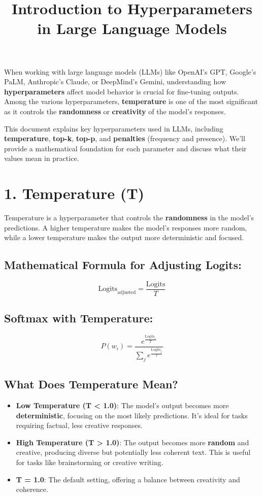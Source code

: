 \documentclass{article}
\title{Introduction to Hyperparameters in Large Language Models}
\author{}
\date{}
\begin{document}
\maketitle

When working with large language models (LLMs) like OpenAI's GPT, Google’s PaLM, Anthropic’s Claude, or DeepMind's Gemini, understanding how \textbf{hyperparameters} affect model behavior is crucial for fine-tuning outputs. Among the various hyperparameters, \textbf{temperature} is one of the most significant as it controls the \textbf{randomness} or \textbf{creativity} of the model's responses.

This document explains key hyperparameters used in LLMs, including \textbf{temperature}, \textbf{top-k}, \textbf{top-p}, and \textbf{penalties} (frequency and presence). We'll provide a mathematical foundation for each parameter and discuss what their values mean in practice.

\section{1. Temperature (T)}

Temperature is a hyperparameter that controls the \textbf{randomness} in the model's predictions. A higher temperature makes the model’s responses more random, while a lower temperature makes the output more deterministic and focused.

\subsection*{Mathematical Formula for Adjusting Logits:}
\[
\text{Logits}_{\text{adjusted}} = \frac{\text{Logits}}{T}
\]

\subsection*{Softmax with Temperature:}
\[
P(w_i) = \frac{e^{\frac{\text{Logits}_i}{T}}}{\sum_{j} e^{\frac{\text{Logits}_j}{T}}}
\]

\subsection*{What Does Temperature Mean?}
\begin{itemize}
    \item \textbf{Low Temperature (T < 1.0)}: The model’s output becomes more \textbf{deterministic}, focusing on the most likely predictions. It's ideal for tasks requiring factual, less creative responses.
    \item \textbf{High Temperature (T > 1.0)}: The output becomes more \textbf{random} and creative, producing diverse but potentially less coherent text. This is useful for tasks like brainstorming or creative writing.
    \item \textbf{T = 1.0}: The default setting, offering a balance between creativity and coherence.
\end{itemize}
\end{document}
